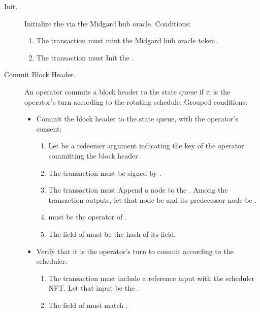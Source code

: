 \documentclass[../midgard.tex]{subfiles}
\begin{document}
\begin{description}
    \item[Init.] Initialize the  via the Midgard hub oracle.
      Conditions:
        \begin{enumerate}
            \item The transaction must mint the Midgard hub oracle token.
            \item The transaction must Init the .
        \end{enumerate}

    \item[Commit Block Header.] An operator commits a block header to the state queue if it is the operator's turn according to the rotating schedule.
      Grouped conditions:
        \begin{itemize}
            \item Commit the block header to the state queue, with the operator's consent:
            \begin{enumerate}
                \item Let  be a redeemer argument indicating the key of the operator committing the block header.
                \item The transaction must be signed by .
                \item The transaction must Append a node to the .
                  Among the transaction outputs, let that node be  and its predecessor node be .
                \item {} must be the operator of .
                \item The  field of  must be the hash of its  field.
            \end{enumerate}

            \item Verify that it is the operator's turn to commit according to the scheduler:
            \begin{enumerate}[resume]
                \item The transaction must include a reference input with the scheduler NFT.
                  Let that input be the .
                \item The  field of  must match .
            \end{enumerate}


\end{itemize}
\end{description}
\end{document}
